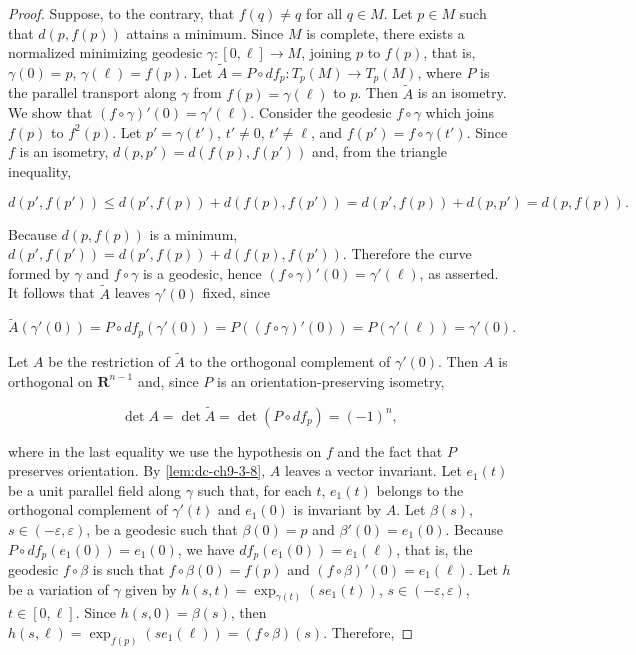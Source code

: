 \begin{proof}
  \sketch
  Suppose, to the contrary, that $f(q)\ne q$ for all $q\in M$.
  Let $p\in M$ such that $d(p,f(p))$ attains a minimum. Since $M$ is complete, there
  exists a normalized minimizing geodesic $\gamma:[0,\ell]\to M$, joining $p$ to
  $f(p)$, that is, $\gamma(0)=p$, $\gamma(\ell)=f(p)$. Let
  $\tilde A=P\circ df_p:T_p(M)\to T_p(M)$, where $P$ is the parallel transport along
  $\gamma$ from $f(p)=\gamma(\ell)$ to $p$. Then $\tilde A$ is an isometry. We show
  that $(f\circ\gamma)'(0)=\gamma'(\ell)$. Consider the geodesic $f\circ\gamma$ which
  joins $f(p)$ to $f^2(p)$. Let $p'=\gamma(t')$, $t'\ne 0$, $t'\ne\ell$, and
  $f(p')=f\circ\gamma(t')$. Since $f$ is an isometry, $d(p,p')=d(f(p),f(p'))$ and,
  from the triangle inequality,

  $$
  d(p',f(p'))\le d(p',f(p))+d(f(p),f(p'))=d(p',f(p))+d(p,p')=d(p,f(p)).
  $$

  Because $d(p,f(p))$ is a minimum, $d(p',f(p'))=d(p',f(p))+d(f(p),f(p'))$. Therefore
  the curve formed by $\gamma$ and $f\circ\gamma$ is a geodesic, hence
  $(f\circ\gamma)'(0)=\gamma'(\ell)$, as asserted. It follows that $\tilde A$ leaves
  $\gamma'(0)$ fixed, since

  $$
  \tilde A(\gamma'(0))=P\circ df_p(\gamma'(0))=P((f\circ\gamma)'(0))=P(\gamma'(\ell))=\gamma'(0).
  $$

  Let $A$ be the restriction of $\tilde A$ to the orthogonal complement of
  $\gamma'(0)$. Then $A$ is orthogonal on $\mathbf{R}^{n-1}$ and, since $P$ is an
  orientation-preserving isometry,

  $$
  \det A=\det\tilde A=\det(P\circ df_p)=(-1)^n,
  $$

  where in the last equality we use the hypothesis on $f$ and the fact that $P$
  preserves orientation. By \cref{lem:dc-ch9-3-8}, $A$ leaves a vector invariant. Let $e_1(t)$
  be a unit parallel field along $\gamma$ such that, for each $t$, $e_1(t)$ belongs to
  the orthogonal complement of $\gamma'(t)$ and $e_1(0)$ is invariant by $A$. Let
  $\beta(s)$, $s\in(-\varepsilon,\varepsilon)$, be a geodesic such that $\beta(0)=p$ and
  $\beta'(0)=e_1(0)$. Because $P\circ df_p(e_1(0))=e_1(0)$, we have
  $df_p(e_1(0))=e_1(\ell)$, that is, the geodesic $f\circ\beta$ is such that
  $f\circ\beta(0)=f(p)$ and $(f\circ\beta)'(0)=e_1(\ell)$. Let $h$ be a variation of
  $\gamma$ given by $h(s,t)=\exp_{\gamma(t)}(se_1(t))$,
  $s\in(-\varepsilon,\varepsilon)$, $t\in[0,\ell]$. Since $h(s,0)=\beta(s)$, then
  $h(s,\ell)=\exp_{f(p)}(se_1(\ell))=(f\circ\beta)(s)$. Therefore,


\end{proof}

